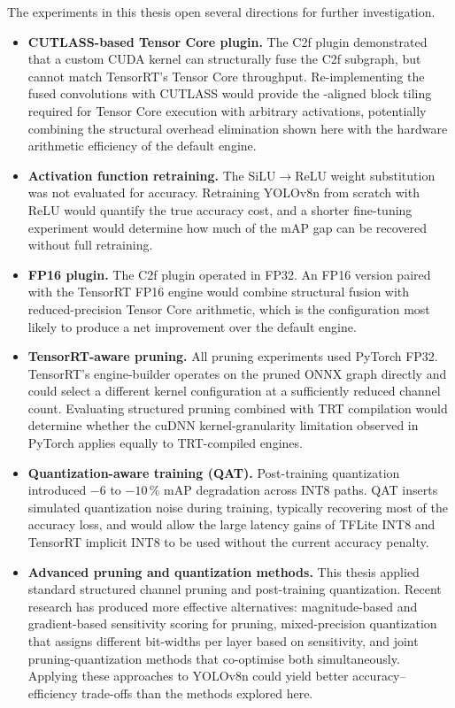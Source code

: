 \documentclass[12pt,a4paper]{report}
\begin{document}
The experiments in this thesis open several directions for further investigation.

\begin{itemize}

\item \textbf{CUTLASS-based Tensor Core plugin.}
The C2f plugin demonstrated that a custom CUDA kernel can structurally fuse the C2f subgraph, but cannot match
TensorRT's  Tensor Core throughput.
Re-implementing the fused convolutions with CUTLASS would provide the -aligned block tiling required for
Tensor Core execution with arbitrary activations, potentially combining the structural overhead elimination shown here
with the hardware arithmetic efficiency of the default engine.

\item \textbf{Activation function retraining.}
The SiLU$\to$ReLU weight substitution was not evaluated for accuracy.
Retraining YOLOv8n from scratch with ReLU would quantify the true accuracy cost, and a shorter fine-tuning experiment
would determine how much of the mAP gap can be recovered without full retraining.

\item \textbf{FP16 plugin.}
The C2f plugin operated in FP32.
An FP16 version paired with the TensorRT FP16 engine would combine structural fusion with reduced-precision Tensor Core
arithmetic, which is the configuration most likely to produce a net improvement over the default engine.

\item \textbf{TensorRT-aware pruning.}
All pruning experiments used PyTorch FP32.
TensorRT's engine-builder operates on the pruned ONNX graph directly and could select a different kernel configuration
at a sufficiently reduced channel count.
Evaluating structured pruning combined with TRT compilation would determine whether the cuDNN kernel-granularity
limitation observed in PyTorch applies equally to TRT-compiled engines.

\item \textbf{Quantization-aware training (QAT).}
Post-training quantization introduced $-6$ to $-10\,\%$ mAP degradation across INT8 paths.
QAT inserts simulated quantization noise during training, typically recovering most of the accuracy loss, and would
allow the large latency gains of TFLite INT8 and TensorRT implicit INT8 to be used without the current accuracy penalty.

\item \textbf{Advanced pruning and quantization methods.}
This thesis applied standard structured channel pruning and post-training quantization.
Recent research has produced more effective alternatives: magnitude-based and gradient-based sensitivity scoring for
pruning, mixed-precision quantization that assigns different bit-widths per layer based on sensitivity, and joint
pruning-quantization methods that co-optimise both simultaneously.
Applying these approaches to YOLOv8n could yield better accuracy--efficiency trade-offs than the methods explored here.


\end{itemize}
\end{document}

